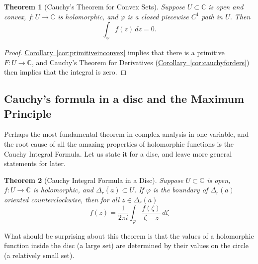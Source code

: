 \documentclass[12pt,openany]{book}
\newcommand{\C}{{\mathbb{C}}}
\theoremstyle{plain}
\newtheorem{thm}{Theorem}[section]
\theoremstyle{remark}
\theoremstyle{definition}
\theoremstyle{exercise}
\theoremstyle{example}
\newcommand{\corref}[1]{\hyperref[#1]{Corollary~\ref*{#1}}}
\begin{document}
\begin{thm}[Cauchy's Theorem for Convex Sets]
Suppose $U \subset \C$ is open and convex, $f \colon U \to \C$ is holomorphic,
and $\varphi$ is a closed piecewise $C^1$ path in $U$.  Then
\begin{equation*}
\int_{\varphi} f(z) \, dz = 0 .
\end{equation*}
\end{thm}

\begin{proof}
\corref{cor:primitiveinconvex} implies that there is
a primitive $F \colon U \to \C$, and
Cauchy's Theorem for Derivatives (\corref{cor:cauchyforders}) then implies that the integral is zero.
\end{proof}

\subsection{Cauchy's formula in a disc and the Maximum Principle}

Perhaps the most fundamental theorem in complex analysis in one variable,
and the root cause of all the amazing properties of holomorphic functions
is the Cauchy Integral Formula.  Let us state it for a disc, and leave
more general statements for later.

\begin{thm}[Cauchy Integral Formula in a Disc]
Suppose $U \subset \C$ is open, $f \colon U \to \C$ is holomorphic,
and $\overline{\Delta_r(a)} \subset U$.
If $\varphi$ is the boundary of $\Delta_r(a)$ oriented counterclockwise,
then for all $z \in \Delta_r(a)$
\begin{equation*}
f(z)
=
\frac{1}{2\pi i}
\int_{\varphi}
\frac{f(\zeta)}{\zeta-z}
\,
d \zeta
\end{equation*}
\end{thm}

What should be surprising about this theorem is that the values of a
holomorphic function inside the disc (a large set) are determined by their
values on the circle (a relatively small set).
\end{document}
